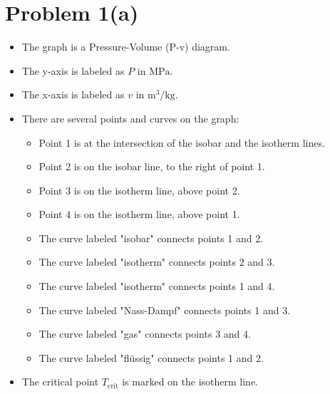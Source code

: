 \section*{Problem 1(a)}

\begin{itemize}
    \item The graph is a Pressure-Volume (P-v) diagram.
    \item The y-axis is labeled as \( P \) in \( \text{MPa} \).
    \item The x-axis is labeled as \( v \) in \( \text{m}^3/\text{kg} \).
    \item There are several points and curves on the graph:
        \begin{itemize}
            \item Point 1 is at the intersection of the isobar and the isotherm lines.
            \item Point 2 is on the isobar line, to the right of point 1.
            \item Point 3 is on the isotherm line, above point 2.
            \item Point 4 is on the isotherm line, above point 1.
            \item The curve labeled "isobar" connects points 1 and 2.
            \item The curve labeled "isotherm" connects points 2 and 3.
            \item The curve labeled "isotherm" connects points 1 and 4.
            \item The curve labeled "Nass-Dampf" connects points 1 and 3.
            \item The curve labeled "gas" connects points 3 and 4.
            \item The curve labeled "flüssig" connects points 1 and 2.
        \end{itemize}
    \item The critical point \( T_{\text{crit}} \) is marked on the isotherm line.
\end{itemize}